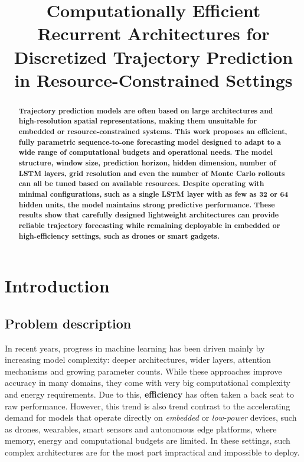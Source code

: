 \documentclass{article}
\title{Computationally Efficient Recurrent Architectures for Discretized Trajectory Prediction in Resource-Constrained Settings}
\begin{document}
\maketitle

\begin{abstract}
    \textbf{Trajectory prediction models are often based on large architectures and high-resolution spatial representations, making them unsuitable for embedded or resource-constrained systems. This work proposes an efficient, fully parametric sequence-to-one forecasting model designed to adapt to a wide range of computational budgets and operational needs. The model structure, window size, prediction horizon, hidden dimension, number of LSTM layers, grid resolution and even the number of Monte Carlo rollouts can all be tuned based on available resources. Despite operating with minimal configurations, such as a single LSTM layer with as few as 32 or 64 hidden units, the model maintains strong predictive performance. These results show that carefully designed lightweight architectures can provide reliable trajectory forecasting while remaining deployable in embedded or high-efficiency settings, such as drones or smart gadgets.}
    
\end{abstract}

\section{Introduction}
\label{sec:intro}

\subsection{Problem description}
In recent years, progress in machine learning has been driven mainly by increasing model complexity: deeper architectures, wider layers, attention mechanisms and growing parameter counts. While these approaches improve accuracy in many domains, they come with very big computational complexity and energy requirements. Due to this, \textbf{efficiency} has often taken a back seat to raw performance. However, this trend is also trend contrast to the accelerating demand for models that operate directly on \textit{embedded} or \textit{low-power} devices, such as drones, wearables, smart sensors and autonomous edge platforms, where memory, energy and computational budgets are limited. In these settings, such complex architectures are for the most part impractical and impossible to deploy.
\end{document}
